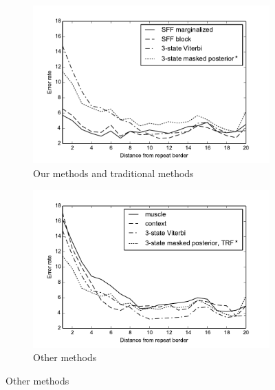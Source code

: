 \begin{figure}
\begin{center}
\begin{subfigure}{0.5\textwidth}
\includegraphics[width=\textwidth]{../figures/error_graph_overview.pdf}
\caption{Our methods and traditional methods}
\end{subfigure}%
\begin{subfigure}{0.5\textwidth}
\includegraphics[width=\textwidth]{../figures/error_graph_other.pdf}
\caption{Other methods}
\end{subfigure}%


\end{center}
\end{figure}
